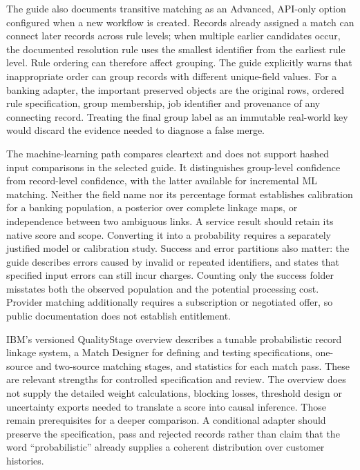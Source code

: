 The guide also documents transitive matching as an Advanced, API-only option
configured when a new workflow is created. Records already assigned a match can
connect later records across rule levels; when multiple earlier candidates occur,
the documented resolution rule uses the smallest identifier from the earliest
rule level. Rule ordering can therefore affect grouping. The guide explicitly
warns that inappropriate order can group records with different unique-field
values. For a banking adapter, the important preserved objects are the original
rows, ordered rule specification, group membership, job identifier and provenance
of any connecting record. Treating the final group label as an immutable real-world
key would discard the evidence needed to diagnose a false merge.

The machine-learning path compares cleartext and does not support hashed input
comparisons in the selected guide. It distinguishes group-level confidence from
record-level confidence, with the latter available for incremental ML matching.
Neither the field name nor its percentage format establishes calibration for a
banking population, a posterior over complete linkage maps, or independence
between two ambiguous links. A service result should retain its native score and
scope. Converting it into a probability requires a separately justified model or
calibration study. Success and error partitions also matter: the guide describes
errors caused by invalid or repeated identifiers, and states that specified input
errors can still incur charges. Counting only the success folder misstates both
the observed population and the potential processing cost. Provider matching
additionally requires a subscription or negotiated offer, so public documentation
does not establish entitlement.\cite{exec22_obs_aws_er_manual}

IBM's versioned QualityStage overview describes a tunable probabilistic record
linkage system, a Match Designer for defining and testing specifications,
one-source and two-source matching stages, and statistics for each match pass.
These are relevant strengths for controlled specification and review. The
overview does not supply the detailed weight calculations, blocking losses,
threshold design or uncertainty exports needed to translate a score into causal
inference. Those remain prerequisites for a deeper comparison. A conditional
adapter should preserve the specification, pass and rejected records rather than
claim that the word ``probabilistic'' already supplies a coherent distribution
over customer histories.\cite{exec22_obs_ibm_matching}

